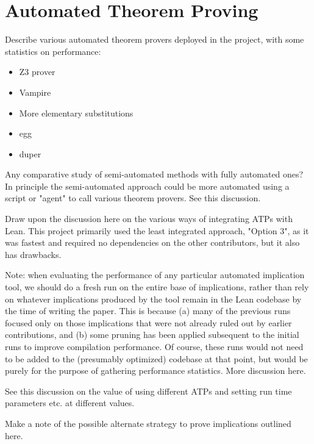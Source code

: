
\section{Automated Theorem Proving}\label{automated-sec}


Describe various automated theorem provers deployed in the project, with some statistics on performance:

\begin{itemize}
    \item Z3 prover
    \item Vampire
    \item More elementary substitutions
    \item egg
    \item duper
\end{itemize}

Any comparative study of semi-automated methods with fully automated ones? In principle the semi-automated approach could be more automated using a script or "agent" to call various theorem provers. See this discussion.

Draw upon the discussion here on the various ways of integrating ATPs with Lean. This project primarily used the least integrated approach, "Option 3", as it was fastest and required no dependencies on the other contributors, but it also has drawbacks.

Note: when evaluating the performance of any particular automated implication tool, we should do a fresh run on the entire base of implications, rather than rely on whatever implications produced by the tool remain in the Lean codebase by the time of writing the paper. This is because (a) many of the previous runs focused only on those implications that were not already ruled out by earlier contributions, and (b) some pruning has been applied subsequent to the initial runs to improve compilation performance. Of course, these runs would not need to be added to the (presumably optimized) codebase at that point, but would be purely for the purpose of gathering performance statistics. More discussion here.

See this discussion on the value of using different ATPs and setting run time parameters etc. at different values.

Make a note of the possible alternate strategy to prove implications outlined here.

